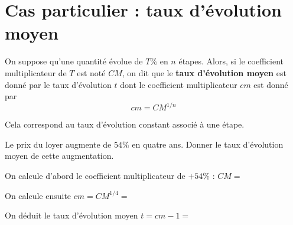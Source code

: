 \documentclass{article}
\begin{document}
\section{Cas particulier : taux d'évolution moyen}
\begin{definition}
On suppose qu'une quantité évolue de $T\%$ en $n$ étapes. Alors, si le coefficient multiplicateur de $T$ est noté $CM$, on dit que le \textbf{taux d'évolution moyen} est donné par le taux d'évolution $t$ dont le coefficient multiplicateur $cm$ est donné par
\begin{equation*}
cm = CM^{1/n}
\end{equation*}

Cela correspond au taux d'évolution constant associé à une étape. 
\end{definition}
\begin{center}
\end{center}
\begin{example}
Le prix du loyer augmente de $54\%$ en quatre ans. Donner le taux d'évolution moyen de cette augmentation.

\begin{enumquestions}
\item On calcule d'abord le coefficient multiplicateur de $+ 54\%$ : $CM = $ \answersline
\item On calcule ensuite $cm = CM^{1/4} = $ \answersline
\item On déduit le taux d'évolution moyen $t = cm - 1 =$ \answersline
\end{enumquestions}
\end{example}
\end{document}
